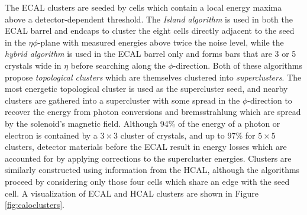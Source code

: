 The ECAL clusters are seeded by cells which contain a local energy maxima above a detector-dependent threshold. The \textit{Island algorithm} is used in both the ECAL barrel and endcaps to cluster the eight cells directly adjacent to the seed in the $\eta\phi$-plane with measured energies above twice the noise level, while the \textit{hybrid algorithm} is used in the ECAL barrel only and forms bars that are 3 or 5 crystals wide in $\eta$ before searching along the $\phi$-direction. Both of these algorithms propose \textit{topological clusters} which are themselves clustered into \textit{superclusters}. The most energetic topological cluster is used as the supercluster seed, and nearby clusters are gathered into a supercluster with some spread in the $\phi$-direction to recover the energy from photon conversions and bremsstrahlung which are spread by the solenoid's magnetic field. Although 94\% of the energy of a photon or electron is contained by a $3\times3$ cluster of crystals, and up to 97\% for $5\times5$ clusters, detector materials before the ECAL result in energy losses which are accounted for by applying corrections to the supercluster energies. Clusters are similarly constructed using information from the HCAL, although the algorithms proceed by considering only those four cells which share an edge with the seed cell. A visualization of ECAL and HCAL clusters are shown in Figure \ref{fig:caloclusters}.

